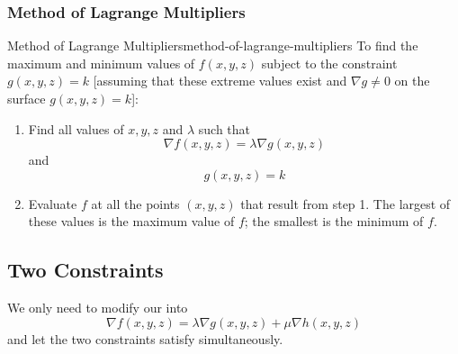 \documentclass[math,code]{amznotes}
\theoremstyle{remark}
\begin{document}
\subsubsection{Method of Lagrange Multipliers}
\begin{thmbox}{Method of Lagrange Multipliers}{method-of-lagrange-multipliers}
    To find the maximum and minimum values of $f(x,y,z)$ subject to the constraint $g(x,y,z)=k$ [assuming that these extreme values exist and $\nabla g \neq 0$ on the surface $g(x,y,z)=k$]:
    \begin{enumerate}
        \item Find all values of $x,y,z$ and $\lambda$ such that
        \begin{displaymath}
            \nabla f(x,y,z) = \lambda \nabla g(x,y,z)
        \end{displaymath}
        and
        \begin{displaymath}
            g(x,y,z)=k
        \end{displaymath}
        \item Evaluate $f$ at all the points $(x,y,z)$ that result from step 1. The largest of these values is the maximum value of $f$; the smallest is the minimum of $f$.
    \end{enumerate}
\end{thmbox}
\subsection{Two Constraints}
We only need to modify our  into
\begin{displaymath}
    \nabla f(x,y,z)=\lambda \nabla g(x,y,z) + \mu \nabla h(x,y,z)
\end{displaymath}
and let the two constraints satisfy simultaneously.
\end{document}
